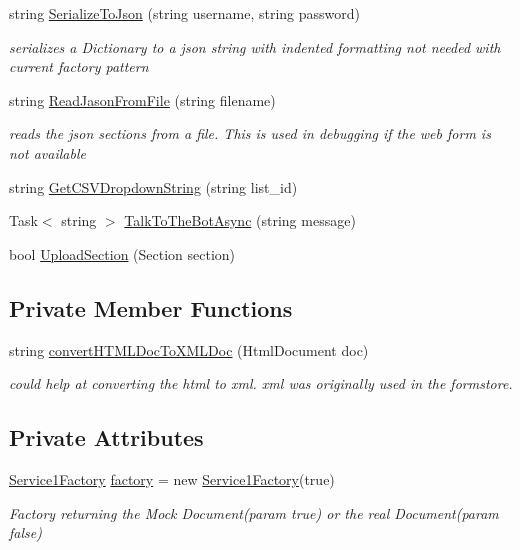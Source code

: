\begin{DoxyCompactItemize}
string \hyperlink{class_wcf_service1_1_1_service1_abc900a9de8f8aa5a126f1eef3353b154}{Serialize\+To\+Json} (string username, string password)
\begin{DoxyCompactList}\small\item\em serializes a Dictionary to a json string with indented formatting not needed with current factory pattern \end{DoxyCompactList}\item 
string \hyperlink{class_wcf_service1_1_1_service1_a1efce216795958b0c4e3f176665027fe}{Read\+Jason\+From\+File} (string filename)
\begin{DoxyCompactList}\small\item\em reads the json sections from a file. This is used in debugging if the web form is not available \end{DoxyCompactList}\item 
string \hyperlink{class_wcf_service1_1_1_service1_a3c0423e72454f64650ca89e43aa30955}{Get\+C\+S\+V\+Dropdown\+String} (string list\+\_\+id)
\item 
Task$<$ string $>$ \hyperlink{class_wcf_service1_1_1_service1_a3073c327f0dae7f2a6324341bbefcaf8}{Talk\+To\+The\+Bot\+Async} (string message)
\item 
bool \hyperlink{class_wcf_service1_1_1_service1_a4ba31cd1a202c84fac4d03461d8f4361}{Upload\+Section} (Section section)
\end{DoxyCompactItemize}
\subsection*{Private Member Functions}
\begin{DoxyCompactItemize}
\item 
string \hyperlink{class_wcf_service1_1_1_service1_a499bdb13585860a3ac6042e511b267ef}{convert\+H\+T\+M\+L\+Doc\+To\+X\+M\+L\+Doc} (Html\+Document doc)
\begin{DoxyCompactList}\small\item\em could help at converting the html to xml. xml was originally used in the formstore. \end{DoxyCompactList}\end{DoxyCompactItemize}
\subsection*{Private Attributes}
\begin{DoxyCompactItemize}
\item 
\hyperlink{class_wcf_service1_1_1_service1_factory}{Service1\+Factory} \hyperlink{class_wcf_service1_1_1_service1_a7ff9458393176c80aa7d4365896de3b0}{factory} = new \hyperlink{class_wcf_service1_1_1_service1_factory}{Service1\+Factory}(true)
\begin{DoxyCompactList}\small\item\em Factory returning the Mock Document(param true) or the real Document(param false) \end{DoxyCompactList}\end{DoxyCompactItemize}


